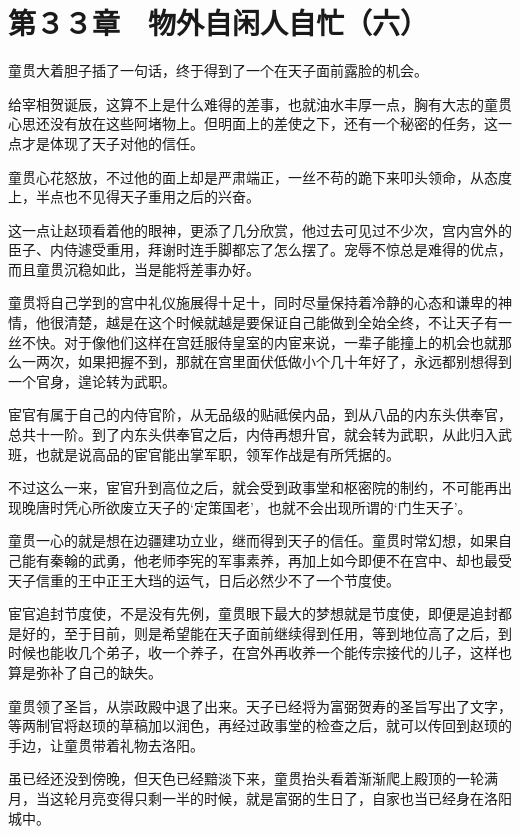 \section{第３３章　物外自闲人自忙（六）}

童贯大着胆子插了一句话，终于得到了一个在天子面前露脸的机会。

给宰相贺诞辰，这算不上是什么难得的差事，也就油水丰厚一点，胸有大志的童贯心思还没有放在这些阿堵物上。但明面上的差使之下，还有一个秘密的任务，这一点才是体现了天子对他的信任。

童贯心花怒放，不过他的面上却是严肃端正，一丝不苟的跪下来叩头领命，从态度上，半点也不见得天子重用之后的兴奋。

这一点让赵顼看着他的眼神，更添了几分欣赏，他过去可见过不少次，宫内宫外的臣子、内侍遽受重用，拜谢时连手脚都忘了怎么摆了。宠辱不惊总是难得的优点，而且童贯沉稳如此，当是能将差事办好。

童贯将自己学到的宫中礼仪施展得十足十，同时尽量保持着冷静的心态和谦卑的神情，他很清楚，越是在这个时候就越是要保证自己能做到全始全终，不让天子有一丝不快。对于像他们这样在宫廷服侍皇室的内宦来说，一辈子能撞上的机会也就那么一两次，如果把握不到，那就在宫里面伏低做小个几十年好了，永远都别想得到一个官身，遑论转为武职。

宦官有属于自己的内侍官阶，从无品级的贴祗侯内品，到从八品的内东头供奉官，总共十一阶。到了内东头供奉官之后，内侍再想升官，就会转为武职，从此归入武班，也就是说高品的宦官能出掌军职，领军作战是有所凭据的。

不过这么一来，宦官升到高位之后，就会受到政事堂和枢密院的制约，不可能再出现晚唐时凭心所欲废立天子的‘定策国老’，也就不会出现所谓的‘门生天子’。

童贯一心的就是想在边疆建功立业，继而得到天子的信任。童贯时常幻想，如果自己能有秦翰的武勇，他老师李宪的军事素养，再加上如今即便不在宫中、却也最受天子信重的王中正王大珰的运气，日后必然少不了一个节度使。

宦官追封节度使，不是没有先例，童贯眼下最大的梦想就是节度使，即便是追封都是好的，至于目前，则是希望能在天子面前继续得到任用，等到地位高了之后，到时候也能收几个弟子，收一个养子，在宫外再收养一个能传宗接代的儿子，这样也算是弥补了自己的缺失。

童贯领了圣旨，从崇政殿中退了出来。天子已经将为富弼贺寿的圣旨写出了文字，等两制官将赵顼的草稿加以润色，再经过政事堂的检查之后，就可以传回到赵顼的手边，让童贯带着礼物去洛阳。

虽已经还没到傍晚，但天色已经黯淡下来，童贯抬头看着渐渐爬上殿顶的一轮满月，当这轮月亮变得只剩一半的时候，就是富弼的生日了，自家也当已经身在洛阳城中。

